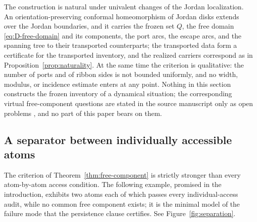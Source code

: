 The construction is natural under univalent changes of the Jordan localization. An
orientation-preserving conformal homeomorphism of Jordan disks extends over the Jordan
boundaries, and it carries the frozen set $Q$, the free domain \eqref{eq:D-free-domain}
and its components, the port arcs, the escape arcs, and the spanning tree to their
transported counterparts; the transported data form a certificate for the transported
inventory, and the realized carriers correspond as in
Proposition~\ref{prop:naturality}. At the same time the criterion is qualitative: the
number of ports and of ribbon sides is not bounded uniformly, and no width, modulus, or
incidence estimate enters at any point. Nothing in this section constructs the frozen
inventory of a dynamical situation; the corresponding virtual free-component questions
are stated in the source manuscript only as open problems \cite{MWman}, and no part of
this paper bears on them.

\subsection{A separator between individually accessible atoms}\label{subsec:D-example}

The criterion of Theorem~\ref{thm:free-component} is strictly stronger than every
atom-by-atom access condition. The following example, promised in the introduction,
exhibits two atoms each of which passes every individual-access audit, while no common
free component exists; it is the minimal model of the failure mode that the persistence
clause certifies. See Figure~\ref{fig:separation}.


